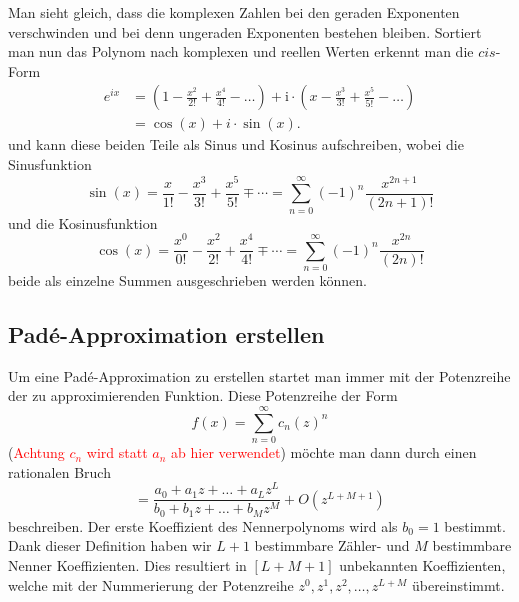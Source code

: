 Man sieht gleich, dass die komplexen Zahlen bei den geraden Exponenten verschwinden und bei denn ungeraden Exponenten bestehen bleiben. 
Sortiert man nun das Polynom nach komplexen und reellen Werten erkennt man die $cis$-Form 
\begin{align*}
e^{ix}
&=
\left(1-\frac{x^{2}}{2 !}+\frac{x^{4}}{4 !}-\ldots\right)+\mathrm{i} \cdot\left(x-\frac{x^{3}}{3 !}+\frac{x^{5}}{5 !}-\ldots\right)
\\
&=
\cos(x)+i\cdot \sin(x).
\end{align*}
und kann diese beiden Teile als Sinus und Kosinus aufschreiben,
wobei die Sinusfunktion 
\begin{equation*}
\sin (x)
=
\frac{x}{1 !}-\frac{x^{3}}{3 !}+\frac{x^{5}}{5 !} \mp \cdots
=
\sum_{n=0}^{\infty}(-1)^{n} \frac{x^{2 n+1}}{(2 n+1) !}
\end{equation*}
und die Kosinusfunktion 
\begin{equation*}
\cos (x)
=
\frac{x^{0}}{0 !}-\frac{x^{2}}{2 !}+\frac{x^{4}}{4 !} \mp \cdots
=
\sum_{n=0}^{\infty}(-1)^{n} \frac{x^{2 n}}{(2 n) !}
\end{equation*}
beide als einzelne Summen ausgeschrieben werden können.



\subsection{Padé-Approximation erstellen
	\label{pade:subsection:Pade_erstellen}}

Um eine Padé-Approximation zu erstellen startet man immer mit der Potenzreihe der zu approximierenden Funktion.
Diese Potenzreihe der Form 
\begin{equation}
f(x)=\sum_{n=0}^{\infty} c_{n} (z)^{n} 
\end{equation}
(\textcolor{red}{Achtung $c_n$ wird statt $a_n$ ab hier verwendet}) 
möchte man dann durch einen rationalen Bruch 
\begin{equation}
[L/M]
=
\frac{a_0 + a_1 z + \dots + a_L z^L}{b_0 + b_1 z + \dots + b_M z^M}
+O(z^{L+M+1})
\end{equation}
beschreiben.
Der erste Koeffizient des Nennerpolynoms wird als $b_0 = 1$ bestimmt.
Dank dieser Definition haben wir $L+1$ bestimmbare Zähler- und $M$ bestimmbare Nenner Koeffizienten. 
Dies resultiert in $[L+M+1]$ unbekannten Koeffizienten, welche mit der Nummerierung der Potenzreihe $z^0, z^1, z^2,\dots , z^{L+M}$ übereinstimmt.

